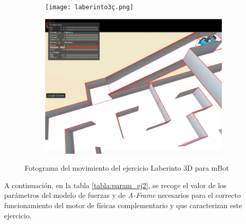 \begin{figure}[h!]
\begin{subfigure}[b]{0.5\textwidth}
  \end{subfigure}
    \hfill
    \hfill
  \begin{subfigure}[b]{0.5\textwidth}
    \texttt{[image: laberinto3ç.png]}
  \end{subfigure}
    \hfill
  \begin{subfigure}[b]{0.5\textwidth}
    \includegraphics[width=\textwidth, height=\textwidth]{laberinto4.png}
  \end{subfigure}
    \caption{Fotograma del movimiento del ejercicio Laberinto 3D para mBot}
    \label{fig:laberinto_movimiento}
\end{figure}


\clearpage

A continuación, en la tabla \ref{tabla:param_ej2}, se recoge el valor de los parámetros del modelo de fuerzas y de  \textit{A-Frame} necesarios para el correcto funcionamiento del motor de físicas complementario y que caracterizan este ejercicio.

